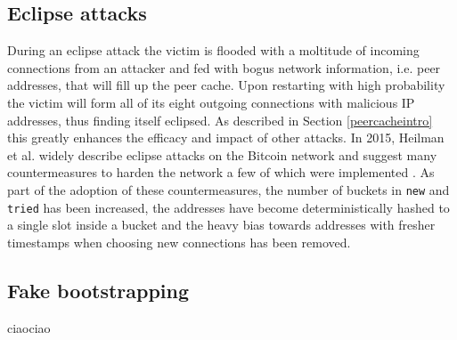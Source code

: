 \documentclass[12pt, letterpaper, twoside]{article}
\begin{document}
\subsection{Eclipse attacks}
During an eclipse attack the victim is flooded with a moltitude of incoming connections from an attacker and fed with bogus network information, i.e. peer addresses, that will fill up the peer cache. Upon restarting with high probability the victim will form all of its eight outgoing connections with malicious IP addresses, thus finding itself eclipsed. As described in Section \ref{peercacheintro} this greatly enhances the efficacy and impact of other attacks. In 2015, Heilman et al. widely describe eclipse attacks on the Bitcoin network and suggest many countermeasures to harden the network a few of which were implemented \cite{eclipseatk}. As part of the adoption of these countermeasures, the number of buckets in \texttt{new} and \texttt{tried} has been increased, the addresses have become deterministically hashed to a single slot inside a bucket and the heavy bias towards addresses with fresher timestamps when choosing new connections has been removed.

\subsection{Fake bootstrapping}
ciaociao \cite{decentrbootstrapp2p}




















\end{document}
